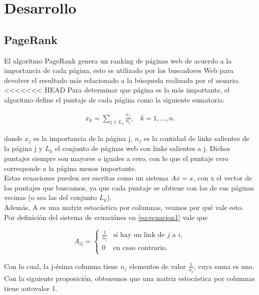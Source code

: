 \section{Desarrollo}

\subsection{PageRank}

El algoritmo PageRank genera un ranking de páginas web de acuerdo a la importancia de cada página, esto es utilizado por los buscadores Web para devolver el resultado más relacionado a la búsqueda realizada por el usuario.\\

<<<<<<< HEAD
Para determinar que página es la más importante, el algoritmo define el puntaje de cada página como la siguiente sumatoria:

\begin{eqnarray}
x_k = \sum_{j \in L_k} \frac{x_j}{n_j},~~~~k = 1,\dots,n.\label{eq:ecuacion1}
\end{eqnarray}

donde $x_{j}$ es la importancia de la página j, $n_{j}$ es la cantidad de links salientes de la página j y $L_{k}$ el conjunto de páginas web con links salientes a j. Dichos puntajes siempre son mayores o iguales a cero, con lo que el puntaje cero corresponde a la página menos importante.\\


Estas ecuaciones pueden ser escritas como un sistema $Ax = x$, con x el vector de los puntajes que buscamos, ya que cada puntaje se obtiene con los de sus páginas vecinas (o sea las del conjunto $L_{k}$).\\

Además, A es una matriz estocástica por columnas, veamos por qué vale esto. Por definición del sistema de ecuaciónes en \ref{eq:ecuacion1} vale que

\begin{equation*}
A_{ij} = \left\{
	\begin{array}{cl}
	\frac{1}{n_{j}} & \text{si hay un link de } j \text{ a } i,\\
	0 & \text{en caso contrario.}\\
	\end{array} \right.
\end{equation*}

Con lo cual, la j-ésima columna tiene $n_{j}$ elementos de valor $\frac{1}{n_{j}}$, cuya suma es uno. Con la siguiente proposición, obtenemos que una matriz estocástica por columnas tiene autovalor 1.\\

